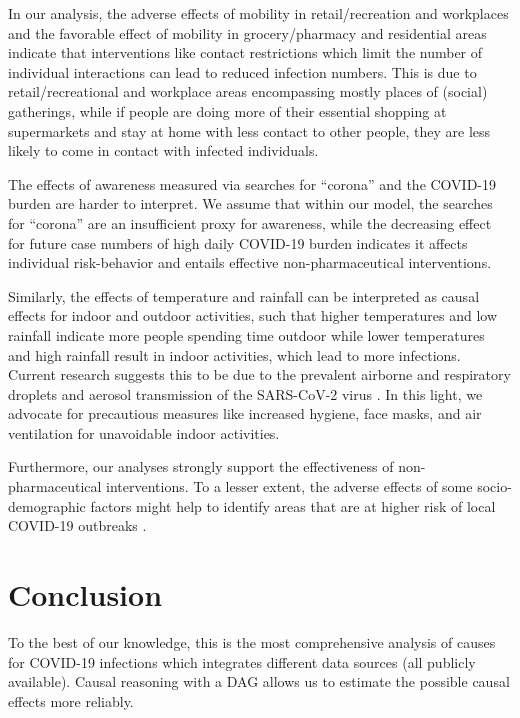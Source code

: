 \documentclass[10pt,letterpaper]{article}
\providecommand{\DIFaddtex}[1]{{\protect\color{blue}\uwave{#1}}} %
\providecommand{\DIFaddbegin}{} %
\providecommand{\DIFaddend}{} %
\providecommand{\DIFadd}[1]{\texorpdfstring{\DIFaddtex{#1}}{#1}} %
\newcommand{\DIFaddincludegraphics}[2][]{{\color{blue}\fbox{\DIFOincludegraphics[#1]{#2}}}} %
\DeclareRobustCommand{\DIFaddbegin}{\DIFOaddbegin \let\includegraphics\DIFaddincludegraphics} %
\DeclareRobustCommand{\DIFaddend}{\DIFOaddend \let\includegraphics\DIFOincludegraphics} %
\begin{document}
In our analysis, the adverse effects of mobility in retail/recreation and workplaces and the favorable effect of mobility in grocery/pharmacy and residential areas indicate that interventions like contact restrictions which limit the number of individual interactions can lead to reduced infection numbers. This is due to retail/recreational and workplace areas encompassing mostly places of (social) gatherings, while if people are doing more of their essential shopping at supermarkets and stay at home with less contact to other people, they are less likely to come in contact with infected individuals.

The effects of awareness measured via searches for ``corona'' and the COVID-19 burden are harder to interpret. We assume that within our model, the searches for ``corona'' are an insufficient proxy for awareness, while the decreasing effect for future case numbers of high daily COVID-19 burden indicates it affects individual risk-behavior and entails effective non-pharmaceutical interventions.

Similarly, the effects of temperature and rainfall can be interpreted as causal effects for indoor and outdoor activities, such that higher temperatures and low rainfall indicate more people spending time outdoor while lower temperatures and high rainfall result in indoor activities, which lead to more infections. Current research suggests this to be due to the prevalent airborne and respiratory droplets and aerosol transmission of the SARS-CoV-2 virus \cite{world2020transmission}. In this light, we advocate for precautious measures like increased hygiene, face masks, and air ventilation for unavoidable indoor activities.

Furthermore, our analyses strongly support the effectiveness of non-pharmaceutical interventions. To a lesser extent, the adverse effects of some socio-demographic factors might help to identify areas that are at higher risk of local COVID-19 outbreaks \DIFaddbegin \DIFadd{and more severe outcomes of infection cases}\DIFaddend .

\section*{Conclusion}\label{conclusions}

To the best of our knowledge, this is the most comprehensive analysis of causes for COVID-19 infections which integrates different data sources (all publicly available). Causal reasoning with a DAG allows us to estimate the possible causal effects more reliably.
\end{document}
